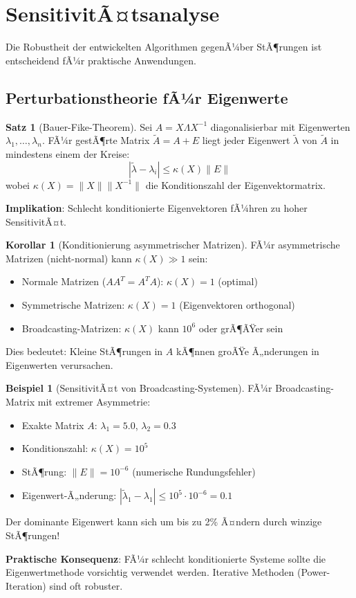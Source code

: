 ﻿\documentclass[a4paper,12pt]{report}
\theoremstyle{definition}
\newtheorem{beispiel}{Beispiel}
\newtheorem{satz}{Satz}
\newtheorem{korollar}{Korollar}
\begin{document}
	\section{SensitivitÃ¤tsanalyse}
	
	Die Robustheit der entwickelten Algorithmen gegenÃ¼ber StÃ¶rungen ist entscheidend fÃ¼r praktische Anwendungen.
	
	\subsection{Perturbationstheorie fÃ¼r Eigenwerte}
	
	\begin{satz}[Bauer-Fike-Theorem]
		Sei $A = X \Lambda X^{-1}$ diagonalisierbar mit Eigenwerten $\lambda_1, \ldots, \lambda_n$. FÃ¼r gestÃ¶rte Matrix $\tilde{A} = A + E$ liegt jeder Eigenwert $\tilde{\lambda}$ von $\tilde{A}$ in mindestens einem der Kreise:
		\[
		|\tilde{\lambda} - \lambda_i| \leq \kappa(X) \|E\|
		\]
		wobei $\kappa(X) = \|X\| \|X^{-1}\|$ die Konditionszahl der Eigenvektormatrix.
		
		\textbf{Implikation}: Schlecht konditionierte Eigenvektoren fÃ¼hren zu hoher SensitivitÃ¤t.
	\end{satz}
	
	\begin{korollar}[Konditionierung asymmetrischer Matrizen]
		FÃ¼r asymmetrische Matrizen (nicht-normal) kann $\kappa(X) \gg 1$ sein:
		\begin{itemize}
			\item Normale Matrizen ($AA^T = A^T A$): $\kappa(X) = 1$ (optimal)
			\item Symmetrische Matrizen: $\kappa(X) = 1$ (Eigenvektoren orthogonal)
			\item Broadcasting-Matrizen: $\kappa(X)$ kann $10^6$ oder grÃ¶ÃŸer sein
		\end{itemize}
		
		Dies bedeutet: Kleine StÃ¶rungen in $A$ kÃ¶nnen groÃŸe Ã„nderungen in Eigenwerten verursachen.
	\end{korollar}
	
	\begin{beispiel}[SensitivitÃ¤t von Broadcasting-Systemen]
		FÃ¼r Broadcasting-Matrix mit extremer Asymmetrie:
		\begin{itemize}
			\item Exakte Matrix $A$: $\lambda_1 = 5.0$, $\lambda_2 = 0.3$
			\item Konditionszahl: $\kappa(X) = 10^5$
			\item StÃ¶rung: $\|E\| = 10^{-6}$ (numerische Rundungsfehler)
			\item Eigenwert-Ã„nderung: $|\tilde{\lambda}_1 - \lambda_1| \leq 10^5 \cdot 10^{-6} = 0.1$
		\end{itemize}
		
		Der dominante Eigenwert kann sich um bis zu 2\% Ã¤ndern durch winzige StÃ¶rungen!
		
		\textbf{Praktische Konsequenz}: FÃ¼r schlecht konditionierte Systeme sollte die Eigenwertmethode vorsichtig verwendet werden. Iterative Methoden (Power-Iteration) sind oft robuster.
	\end{beispiel}
	
\end{document}
